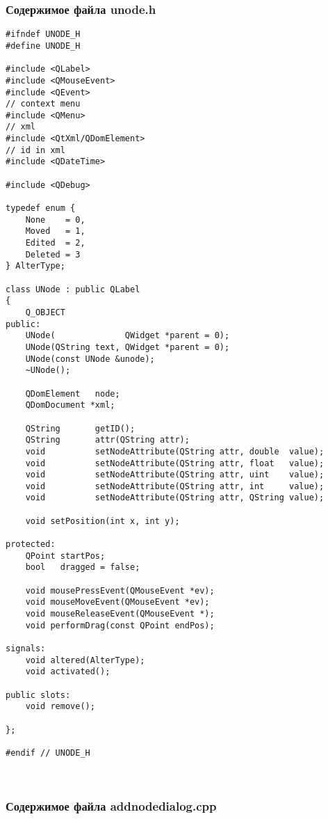 \subsubsection*{Содержимое файла unode.h}

\begin{lstlisting}
#ifndef UNODE_H
#define UNODE_H

#include <QLabel>
#include <QMouseEvent>
#include <QEvent>
// context menu
#include <QMenu>
// xml
#include <QtXml/QDomElement>
// id in xml
#include <QDateTime>

#include <QDebug>

typedef enum {
    None    = 0,
    Moved   = 1,
    Edited  = 2,
    Deleted = 3
} AlterType;

class UNode : public QLabel
{
    Q_OBJECT
public:
    UNode(              QWidget *parent = 0);
    UNode(QString text, QWidget *parent = 0);
    UNode(const UNode &unode);
    ~UNode();

    QDomElement   node;
    QDomDocument *xml;

    QString       getID();
    QString       attr(QString attr);
    void          setNodeAttribute(QString attr, double  value);
    void          setNodeAttribute(QString attr, float   value);
    void          setNodeAttribute(QString attr, uint    value);
    void          setNodeAttribute(QString attr, int     value);
    void          setNodeAttribute(QString attr, QString value);

    void setPosition(int x, int y);

protected:
    QPoint startPos;
    bool   dragged = false;

    void mousePressEvent(QMouseEvent *ev);
    void mouseMoveEvent(QMouseEvent *ev);
    void mouseReleaseEvent(QMouseEvent *);
    void performDrag(const QPoint endPos);

signals:
    void altered(AlterType);
    void activated();

public slots:
    void remove();

};

#endif // UNODE_H
\end{lstlisting}~\\

\subsubsection*{Содержимое файла addnodedialog.cpp}

